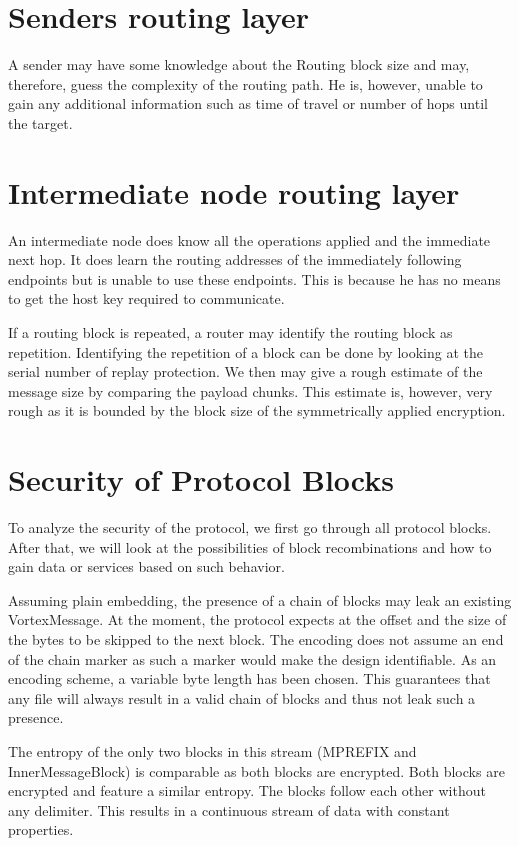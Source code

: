 \section{Senders routing layer}
A sender may have some knowledge about the Routing block size and may, therefore, guess the complexity of the routing path. He is, however, unable to gain any additional information such as time of travel or number of hops until the target.

\section{Intermediate node routing layer}
An intermediate node does know all the operations applied and the immediate next hop. It does learn the routing addresses of the immediately following endpoints but is unable to use these endpoints. This is because he has no means to get the host key required to communicate.

If a routing block is repeated, a router may identify the routing block as repetition. Identifying the repetition of a block can be done by looking at the serial number of replay protection. We then may give a rough estimate of the message size by comparing the payload chunks. This estimate is, however, very rough as it is bounded by the block size of the symmetrically applied encryption.

\section{Security of Protocol Blocks}
To analyze the security of the protocol, we first go through all protocol blocks. After that, we will look at the possibilities of block recombinations and how to gain data or services based on such behavior. 

Assuming plain embedding, the presence of a chain of blocks may leak an existing VortexMessage. At the moment, the protocol expects at the offset and the size of the bytes to be skipped to the next block. The encoding does not assume an end of the chain marker as such a marker would make the design identifiable. As an encoding scheme, a variable byte length has been chosen. This guarantees that any file will always result in a valid chain of blocks and thus not leak such a presence.

The entropy of the only two blocks in this stream (MPREFIX and InnerMessageBlock) is comparable as both blocks are encrypted. Both blocks are encrypted and feature a similar entropy. The blocks follow each other without any delimiter. This results in a continuous stream of data with constant properties. 

